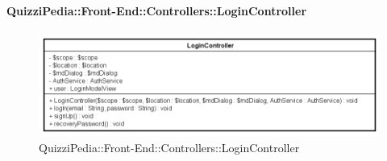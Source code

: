 \paragraph{QuizziPedia::Front-End::Controllers::LoginController}
\begin{figure} [ht]
	\centering
	\includegraphics[scale=0.60]{UML/Classi/Front-End/QuizziPedia_Front-end_Controller_LoginController.png}
	\caption{QuizziPedia::Front-End::Controllers::LoginController}
\end{figure} \FloatBarrier
